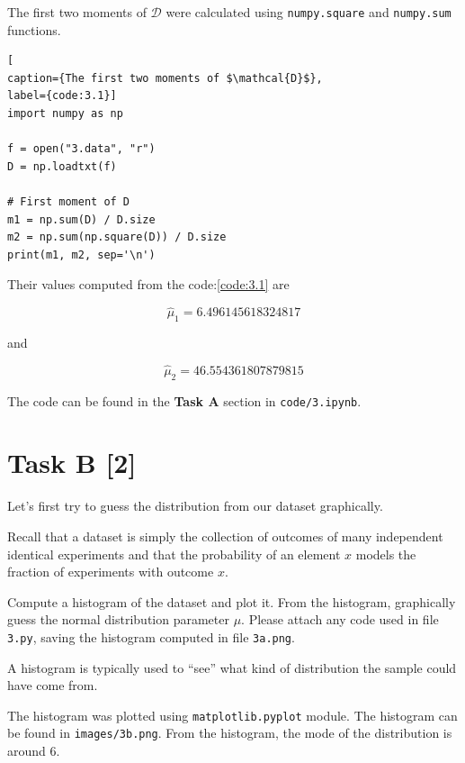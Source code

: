 
The first two moments of $\mathcal{D}$ were calculated using
\texttt{numpy.square} and \texttt{numpy.sum} functions.

\begin{lstlisting}[
caption={The first two moments of $\mathcal{D}$},
label={code:3.1}]
import numpy as np

f = open("3.data", "r")
D = np.loadtxt(f)

# First moment of D
m1 = np.sum(D) / D.size
m2 = np.sum(np.square(D)) / D.size
print(m1, m2, sep='\n')
\end{lstlisting}

Their values computed from the code:\ref{code:3.1} are

\begin{equation*}
    \hat{\mu}_1 = 6.496145618324817
\end{equation*}

and

\begin{equation*}
    \hat{\mu}_2=46.554361807879815
\end{equation*}

The code can be found in the \textbf{Task A} section in \texttt{code/3.ipynb}.

\section*{\colS{$\S$} Task B \hfill \normalfont \large [2]}

\begin{tcolorbox}
    Let’s first try to guess the distribution from our dataset graphically.
    
    Recall that a dataset is simply the collection of outcomes of many independent
    identical experiments and that the probability of an element $x$ models the
    fraction of experiments with outcome $x$.

    Compute a histogram of the dataset and plot it. From the histogram,
    graphically guess the normal distribution parameter $\mu$. Please attach any
    code used in file \texttt{3.py}, saving the histogram computed in file
    \texttt{3a.png}.

    A histogram is typically used to \enquote{see} what kind of distribution the
    sample could have come from.
\end{tcolorbox}


The histogram was plotted using \texttt{matplotlib.pyplot} module. The histogram
can be found in \texttt{images/3b.png}. From the histogram, the mode of the
distribution is around 6.

